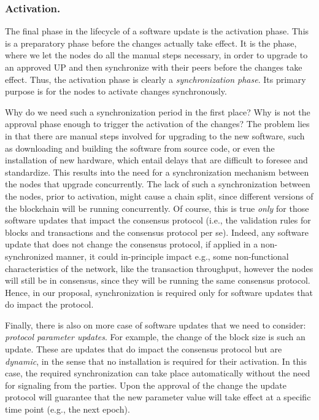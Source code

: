 \subsubsection{Activation.}\label{se:activation}

The final phase in the lifecycle of a software update is the activation phase.
This is a preparatory phase before the changes actually take effect. It is the
phase, where we let the nodes do all the manual steps necessary, in order to
upgrade to an approved UP and then synchronize with their peers before the
changes take effect.
Thus, the activation phase is clearly a \emph{synchronization phase}. Its
primary purpose is for the nodes to activate changes synchronously.

Why do we need such a synchronization period in the first place? Why is not the
approval phase enough to trigger the activation of the changes? The problem
lies in that there are manual steps involved for upgrading to the new software,
such as downloading and building the software from source code, or even the
installation of new hardware, which entail delays that are difficult to foresee
and standardize. This results into the need for a synchronization mechanism
between the nodes that upgrade concurrently. The lack of such a synchronization
between the nodes, prior to activation, might cause a chain split, since
different versions of the blockchain will be running concurrently. Of course,
this is true \emph{only} for those software updates that impact the consensus
protocol (i.e., the validation rules for blocks and transactions and the
consensus protocol per se). Indeed, any software update that does not change
the consensus protocol, if applied in a non-synchronized manner, it could
in-principle impact e.g., some non-functional characteristics of the network,
like the transaction throughput, however the nodes will still be in consensus,
since they will be running the same consensus protocol. Hence, in our proposal,
synchronization is required only for software updates that do impact the
protocol.

Finally, there is also on more case of software updates that we need to
consider: \emph{protocol parameter updates}. For example, the change of the
block size is such an update. These are updates that do impact the consensus
protocol but are \emph{dynamic}, in the sense that no installation is required
for their activation. In this case, the required synchronization can take place
automatically without the need for signaling from the parties. Upon the
approval of the change the update protocol will guarantee that the new
parameter value will take effect at a specific time point (e.g., the next
epoch).

